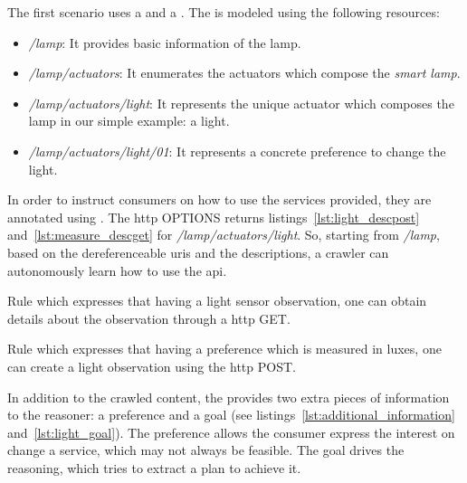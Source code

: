 
The first scenario uses a \prova{} and a \consc{}.
The \prova{} is modeled using the following resources:
\begin{itemize}
  \item \emph{/lamp}: It provides basic information of the lamp.
  \item \emph{/lamp/actuators}: It enumerates the actuators which compose the \emph{smart lamp}.
  \item \emph{/lamp/actuators/light}: It represents the unique actuator which composes the lamp in our simple example: a light.
  \item \emph{/lamp/actuators/light/01}: It represents a concrete preference to change the light.
\end{itemize}



In order to instruct consumers on how to use the services provided, they are annotated using \restdesc{}.
The \acs{http} OPTIONS returns listings~\ref{lst:light_descpost} and~\ref{lst:measure_descget} for \emph{/lamp/actuators/light}.
So, starting from \emph{/lamp}, based on the dereferenceable \acsp{uri} \citep{sauermann_cool_2008} and the descriptions, a crawler can autonomously learn how to use the \acs{api}. %


\begin{listing}
  
  \caption{Rule which expresses that having a light sensor observation, one can obtain details about the observation through a \acs{http} GET.}
  \label{lst:measure_descget}
\end{listing}

\begin{listing}
  
  \caption{Rule which expresses that having a preference which is measured in luxes, one can create a light observation using the \acs{http} POST.}
  \label{lst:light_descpost}
\end{listing}


In addition to the crawled content, the \consc{} provides two extra pieces of information to the reasoner: a preference and a goal (see listings~\ref{lst:additional_information} and~\ref{lst:light_goal}).
The preference allows the consumer express the interest on change a service, which may not always be feasible.
The goal drives the reasoning, which tries to extract a plan to achieve it.

